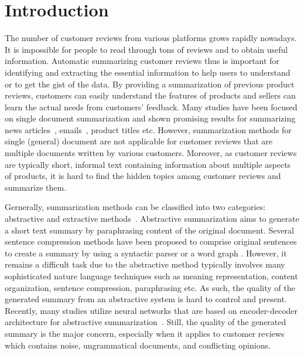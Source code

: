 \documentclass[letterpaper]{article}
\begin{document}
\section{Introduction}
The number of customer reviews from various platforms grows rapidly nowadays.
It is impossible for people to read through tons of reviews and to obtain useful information. Automatic summarizing customer reviews thus is important for identifying and extracting the essential information to help users to understand or to get the gist of the data.
By providing a summarization of previous product reviews, customers can easily understand the features of products and sellers can learn the actual needs from customers' feedback. 
Many studies have been focused on single document summarization and shown promising results for summarizing news articles~\cite{Baralis2013Graphsum, Wei2015Gibberish}, emails~\cite{Carenini2008Summarizing, Paulus2017Deep}, product titles \cite{Sun2018Multi} etc. However, summarization methods for single (general) document are not applicable for customer reviews that are multiple documents written by various customers. 
Moreover, as customer reviews are typically short, informal text containing information about multiple aspects of products, it is hard to find the hidden topics among customer reviews and summarize them. 

Gernerally, summarization methods can be classified  into two categories: abstractive and extractive methods~\cite{Gambhir2017Recent, Pecar2018Towards}. Abstractive summarization aims to generate a short text summary by paraphrasing content of the original document. Several sentence compression methods have been proposed to comprise original sentences to create a summary by using a syntactic parser or a word graph \cite{Genest2010Text, Ffilippova2010Multi, Khan2015Framework}. However, it remains a difficult task due to the abstractive method typically involves many sophisticated nature language techniques such as meaning representation, content organization, sentence compression, paraphrasing etc. As such, the quality of the generated summary from an abstractive system is hard to control and present.  
Recently, many studies utilize neural networks that are based on encoder-decoder architecture for abstractive summarization~\cite{Rush2015Neural, Nayeem2018Abstractive, Cao2018Soft}. Still, the quality of the generated summary is the major concern, especially when it applies to customer reviews which contains noise, ungrammatical documents, and conflicting opinions.
\end{document}
